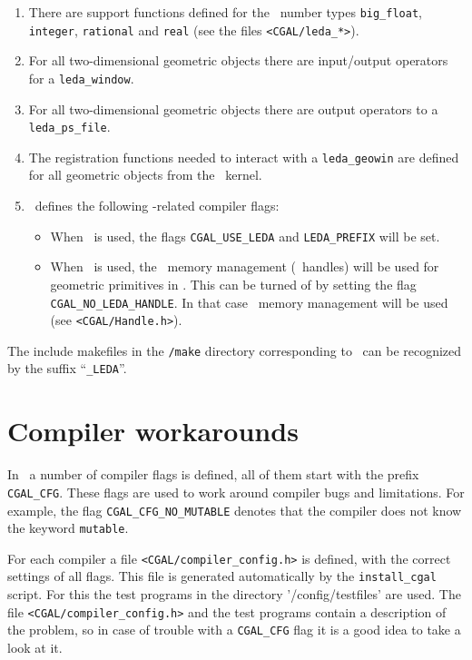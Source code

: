 \begin{enumerate}
\item There are support functions defined for the \leda\ number types
  \texttt{big\_float}, \texttt{integer}, \texttt{rational} and
  \texttt{real} (see the files \texttt{<CGAL/leda\_*>}).
\item For all two-dimensional geometric objects there are input/output
  operators for a \texttt{leda\_window}.
\item For all two-dimensional geometric objects there are output
  operators to a \texttt{leda\_ps\_file}.
\item The registration functions needed to interact with a
  \texttt{leda\_geowin} are defined for all geometric objects from the
  \cgal\ kernel.
\item \cgal\ defines the following \leda-related compiler flags:
\begin{itemize}
\item When \leda\ is used, the flags \texttt{CGAL\_USE\_LEDA} and
  \texttt{LEDA\_PREFIX} will be set.
\item When \leda\ is used, the \leda\ memory management (\leda\ 
  handles) will be used for geometric primitives in \cgal. This can be
  turned of by setting the flag \texttt{CGAL\_NO\_LEDA\_HANDLE}. In
  that case \cgal\ memory management will be used (see
  \texttt{<CGAL/Handle.h>}).
\end{itemize}
\end{enumerate}

The include makefiles in the \texttt{\cgaldir/make} directory
corresponding to \leda\ can be recognized by the suffix
``\texttt{\_LEDA}''.

\section{Compiler workarounds}
In \cgal\ a number of compiler flags is defined, all of them start
with the prefix \texttt{CGAL\_CFG}. These flags are used to work
around compiler bugs and limitations.  For example, the flag
\texttt{CGAL\_CFG\_NO\_MUTABLE} denotes that the compiler does not
know the keyword \texttt{mutable}. 

For each compiler a file \texttt{<CGAL/compiler\_config.h>} is
defined, with the correct settings of all flags. This file is
generated automatically by the \texttt{install\_cgal} script. For this
the test programs in the directory \nonlinkedpath'\cgaldir/config/testfiles'
are used. The file \texttt{<CGAL/compiler\_config.h>} and the test
programs contain a description of the problem, so in case of trouble
with a \texttt{CGAL\_CFG} flag it is a good idea to take a look at it.

